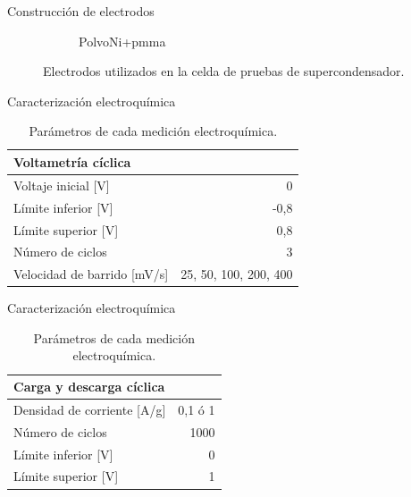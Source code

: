 \documentclass{beamer}
\newcommand{\mPolvoNiquelPMMA}{PolvoNi+pmma }
\begin{document}
\begin{frame}{Construcción de electrodos}
\begin{figure}
\begin{adjustbox}{minipage=\linewidth,frame}
{\begin{subfigure}[b]{\electrodesWidth}
					\caption{\mPolvoNiquelPMMA}
					\label{fig:electrode_powder_pmma_ni}
				\end{subfigure}}
			\end{adjustbox}
			\caption[Electrodos utilizados en la celda de pruebas de supercondensador]{Electrodos utilizados en la celda de pruebas de supercondensador.}
			\label{fig:electrodes}
		\end{figure}
	\end{frame}
	
	\begin{frame}{Caracterización electroquímica}
		\begin{table}[h!]
			\centering
			\begin{tabular}{ l r }
				Voltametría cíclica &  \\
				\hline
				Voltaje inicial [V] & 0 \\
				Límite inferior [V] & -0,8 \\
				Límite superior [V] & 0,8  \\
				Número de ciclos & 3 \\
				Velocidad de barrido [mV/s] & 25, 50, 100, 200, 400
			\end{tabular}
			\label{tab:elec_config}
			\caption[Parámetros de cada medición electroquímica]{Parámetros de cada medición electroquímica.}
		\end{table}
	\end{frame}

	\begin{frame}{Caracterización electroquímica}
\begin{table}[h!]
	\centering
	\begin{tabular}{ l r }
		Carga y descarga cíclica & \\
		\hline
		Densidad de corriente [A/g] & 0,1 ó 	1 \\
		Número de ciclos & 1000 \\
		Límite inferior [V] & 0 \\
		Límite superior [V] & 1 \\
	\end{tabular}
	\label{tab:elec_config}
	\caption[Parámetros de cada medición electroquímica]{Parámetros de cada medición electroquímica.}
\end{table}
\end{frame}
\end{document}
